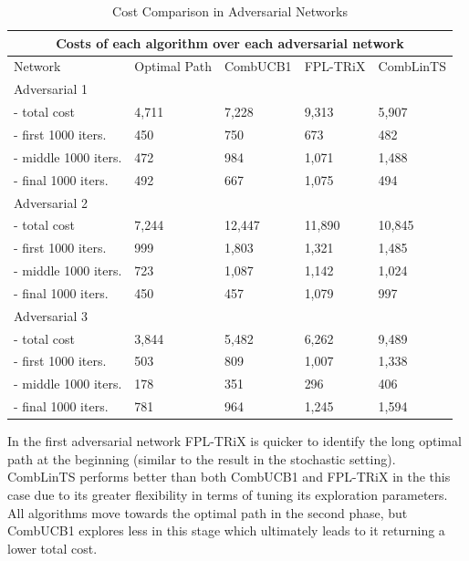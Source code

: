 \begin{table}[ht]
\begin{tabular}{ |p{3.5cm}||p{2cm}|p{2cm}|p{2cm}|p{2cm}|  }
 \hline
 \multicolumn{5}{|c|}{Costs of each algorithm over each adversarial network} \\
 \hline
 Network                    & Optimal Path  & CombUCB1  & FPL-TRiX  & CombLinTS   \\
 \hline
 Adversarial 1      &               &           &           &             \\
  - total cost              & 4,711         & 7,228     & 9,313     & 5,907       \\
  - first 1000 iters.   & 450           & 750       & 673       & 482         \\
  - middle 1000 iters.  & 472           & 984       & 1,071     & 1,488       \\
  - final 1000 iters.   & 492           & 667       & 1,075     & 494         \\
 \hline
 Adversarial 2      &               &           &           &             \\
  - total cost              & 7,244         & 12,447    & 11,890    & 10,845      \\
  - first 1000 iters.   & 999           & 1,803     & 1,321     & 1,485       \\
  - middle 1000 iters.  & 723           & 1,087     & 1,142     & 1,024       \\
  - final 1000 iters.   & 450           & 457       & 1,079     & 997         \\
 \hline
 Adversarial 3      &               &           &           &             \\
  - total cost              & 3,844         & 5,482     & 6,262     & 9,489       \\
  - first 1000 iters.   & 503           & 809       & 1,007     & 1,338       \\
  - middle 1000 iters.  & 178           & 351       & 296       & 406         \\
  - final 1000 iters.   & 781           & 964       & 1,245     & 1,594       \\
 \hline
\end{tabular}
\caption{Cost Comparison in Adversarial Networks}
\end{table}


In the first adversarial network FPL-TRiX is quicker to identify the long optimal path at the beginning (similar to the result in the stochastic setting). CombLinTS performs better than both CombUCB1 and FPL-TRiX in the this case due to its greater flexibility in terms of tuning its exploration parameters. All algorithms move towards the optimal path in the second phase, but CombUCB1 explores less in this stage which ultimately leads to it returning a lower total cost.\\


